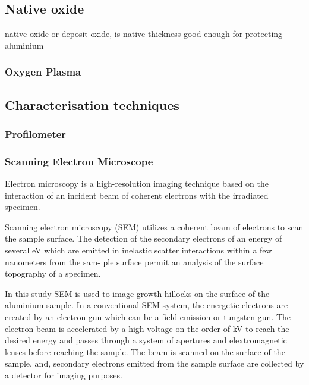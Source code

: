 \documentclass{article}
\begin{document}
\subsection{Native oxide}
native oxide or deposit oxide, is native thickness good enough for protecting aluminium



\subsubsection{Oxygen Plasma}

\subsection{Characterisation techniques}
\subsubsection{Profilometer}

\subsubsection{Scanning Electron Microscope}
Electron microscopy is a high-resolution imaging technique based on the 
interaction of an incident beam of coherent electrons with the irradiated specimen.

Scanning electron microscopy (SEM) utilizes a coherent beam of electrons to scan the
sample surface. The detection of the secondary electrons of an energy of several eV 
which are emitted in inelastic scatter interactions within a few nanometers from the
sam- ple surface permit an analysis of the surface topography of a specimen. 

In this study SEM is used to image growth hillocks on the surface of the aluminium sample. 
In a conventional SEM system, the energetic electrons are created by an electron gun 
which can be a field emission or tungsten gun. The electron beam is accelerated by 
a high voltage on the order of kV to reach the desired energy and passes through a system 
of apertures and elextromagnetic lenses before reaching the sample. 
The beam is scanned on the surface of the sample, and, secondary electrons emitted from the sample surface are collected by a detector for imaging purposes. 
\end{document}
